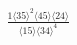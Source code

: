 \documentclass[varwidth, border=5pt]{standalone}
\begin{document}
\begin{my}
$\begin{gathered}
\scriptscriptstyle\frac{1⟨35⟩^2⟨45⟩⟨24⟩}{⟨15⟩⟨34⟩^4}
\end{gathered}$
\end{my}
\end{document}
